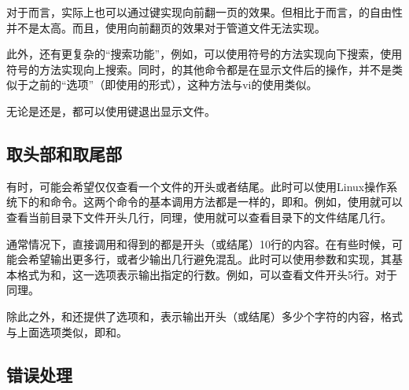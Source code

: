\begin{attention}
    对于而言，实际上也可以通过键实现向前翻一页的效果。但相比于而言，的自由性并不是太高。而且，使用向前翻页的效果对于管道文件无法实现。

    此外，还有更复杂的“搜索功能”，例如，可以使用符号的方法实现向下搜索，使用符号的方法实现向上搜索。同时，的其他命令都是在显示文件后的操作，并不是类似于之前的“选项”（即使用\code{-}的形式），这种方法与vi的使用类似。
\end{attention}

无论是还是，都可以使用键退出显示文件。

\subsection{取头部和取尾部}\label{subsec:查看文件-取头部和取尾部}

有时，可能会希望仅仅查看一个文件的开头或者结尾。此时可以使用Linux操作系统下的和命令。这两个命令的基本调用方法都是一样的，即和。例如，使用就可以查看当前目录下文件开头几行，同理，使用就可以查看目录下的文件结尾几行。

\begin{attention}
    通常情况下，直接调用和得到的都是开头（或结尾）10行的内容。在有些时候，可能会希望输出更多行，或者少输出几行避免混乱。此时可以使用参数和实现，其基本格式为和，这一选项表示输出指定的行数。例如，可以查看文件开头5行。对于同理。

    除此之外，和还提供了选项和，表示输出开头（或结尾）多少个字符的内容，格式与上面选项类似，即和。
\end{attention}

\subsection{错误处理}\label{subsec:查看文件-错误处理}

